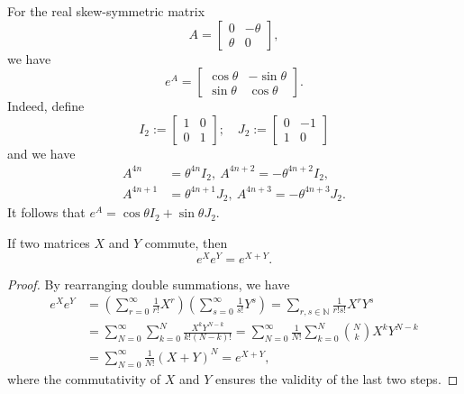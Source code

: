 \begin{exm}
  For the real skew-symmetric matrix
  \begin{displaymath}
    A =
    \begin{bmatrix}
      0 & -\theta
      \\
      \theta & 0
    \end{bmatrix},
  \end{displaymath}
  we have
  \begin{displaymath}
    e^A =
    \begin{bmatrix}
      \cos \theta & -\sin\theta
      \\
      \sin\theta & \cos\theta
    \end{bmatrix}.
  \end{displaymath}
  Indeed, define
  \begin{displaymath}
    I_2 :=
    \begin{bmatrix}
      1 & 0
      \\
      0 & 1
    \end{bmatrix};
    \quad
    J_2 :=
    \begin{bmatrix}
      0 & -1
      \\
      1 & 0
    \end{bmatrix}
  \end{displaymath}
  and we have
  \begin{align*}
    A^{4n} &= \theta^{4n} I_2, \ 
    A^{4n+2} = -\theta^{4n+2} I_2, \\
    A^{4n+1} &= \theta^{4n+1} J_2, \ 
    A^{4n+3} = -\theta^{4n+3} J_2. 
  \end{align*}
  It follows that
  $e^A = \cos\theta I_2 + \sin\theta J_2$. 
\end{exm}

\begin{lem}
  \label{lem:exp-commuteMatrices}
  If two matrices $X$ and $Y$ commute,
  then
  \begin{equation}
    \label{eq:exp-commuteMatrices}
    e^X e^Y = e^{X+Y}.
  \end{equation}
\end{lem}
\begin{proof}
  By rearranging double summations, we have
  \begin{align*}
    e^X e^Y
    &= \left(
      \sum_{r=0}^{\infty} \frac{1}{r!} X^r
      \right)
      \left(
      \sum_{s=0}^{\infty} \frac{1}{s!} Y^s
      \right)
      = \sum_{r,s\in \mathbb{N}} \frac{1}{r! s!} X^rY^s
    \\
    &= \sum_{N=0}^{\infty}\sum_{k=0}^N \frac{X^k Y^{N-k}}{k!(N-k)!} 
      = \sum_{N=0}^{\infty}\frac{1}{N!}
      \sum_{k=0}^N {N \choose k} X^k Y^{N-k}
    \\
    &= \sum_{N=0}^{\infty}\frac{1}{N!} (X+Y)^N
      = e^{X+Y},
  \end{align*}
  where the commutativity of $X$ and $Y$ ensures the validity of the
  last two steps.
\end{proof}

